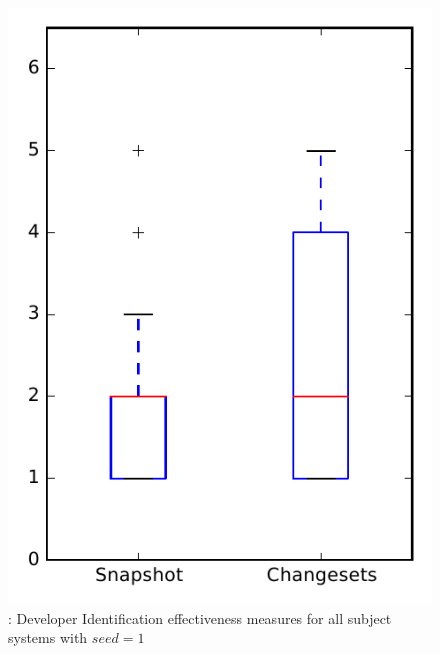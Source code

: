 
\begin{figure}
\centering
\includegraphics[height=0.4\textheight]{figures/dit_seed/rq1_overview_1}
\caption{\rtwo: Developer Identification effectiveness measures for all subject systems with $seed=1$}
\label{fig:dit_seed:rq1:overview}
\end{figure}
